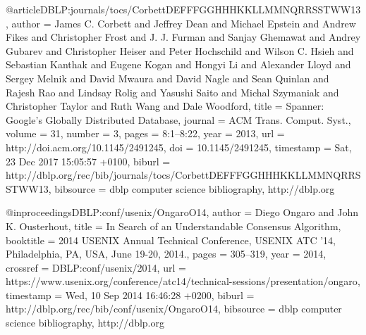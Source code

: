 @article{DBLP:journals/tocs/CorbettDEFFFGGHHHKKLLMMNQRRSSTWW13,
  author    = {James C. Corbett and
               Jeffrey Dean and
               Michael Epstein and
               Andrew Fikes and
               Christopher Frost and
               J. J. Furman and
               Sanjay Ghemawat and
               Andrey Gubarev and
               Christopher Heiser and
               Peter Hochschild and
               Wilson C. Hsieh and
               Sebastian Kanthak and
               Eugene Kogan and
               Hongyi Li and
               Alexander Lloyd and
               Sergey Melnik and
               David Mwaura and
               David Nagle and
               Sean Quinlan and
               Rajesh Rao and
               Lindsay Rolig and
               Yasushi Saito and
               Michal Szymaniak and
               Christopher Taylor and
               Ruth Wang and
               Dale Woodford},
  title     = {Spanner: Google's Globally Distributed Database},
  journal   = {{ACM} Trans. Comput. Syst.},
  volume    = {31},
  number    = {3},
  pages     = {8:1--8:22},
  year      = {2013},
  url       = {http://doi.acm.org/10.1145/2491245},
  doi       = {10.1145/2491245},
  timestamp = {Sat, 23 Dec 2017 15:05:57 +0100},
  biburl    = {http://dblp.org/rec/bib/journals/tocs/CorbettDEFFFGGHHHKKLLMMNQRRSSTWW13},
  bibsource = {dblp computer science bibliography, http://dblp.org}
}

@inproceedings{DBLP:conf/usenix/OngaroO14,
  author    = {Diego Ongaro and
               John K. Ousterhout},
  title     = {In Search of an Understandable Consensus Algorithm},
  booktitle = {2014 {USENIX} Annual Technical Conference, {USENIX} {ATC} '14, Philadelphia,
               PA, USA, June 19-20, 2014.},
  pages     = {305--319},
  year      = {2014},
  crossref  = {DBLP:conf/usenix/2014},
  url       = {https://www.usenix.org/conference/atc14/technical-sessions/presentation/ongaro},
  timestamp = {Wed, 10 Sep 2014 16:46:28 +0200},
  biburl    = {http://dblp.org/rec/bib/conf/usenix/OngaroO14},
  bibsource = {dblp computer science bibliography, http://dblp.org}
}
